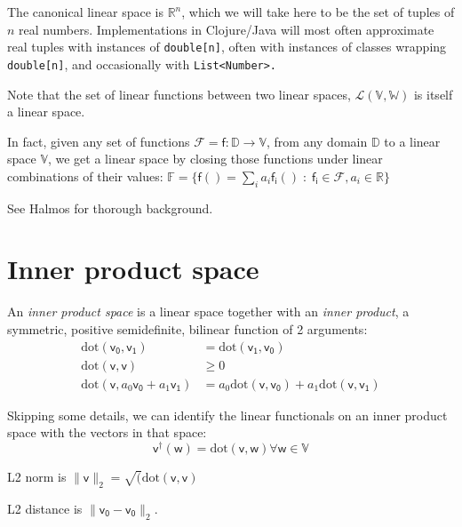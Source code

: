 The canonical linear space is \(\mathbb{R}^n\),
which we will take here to be the set of tuples of \(n\) real
numbers. Implementations in Clojure/Java will most often
approximate real tuples with instances of \texttt{double[n]},
often with instances of classes wrapping \texttt{double[n]},
and occasionally with \texttt{List<Number>.} 

Note that the set of linear functions between two linear
spaces, \(\mathcal{L}(\mathbb{V},\mathbb{W})\) is itself a linear
space. 

In fact, given any set of functions \(\mathcal{F} = {\mathsf{f} :
\mathbb{D} \rightarrow \mathbb{V}}\), 
from any domain \(\mathbb{D}\) to a 
linear space \(\mathbb{V}\),
we get a linear space by closing those functions under linear
combinations of their values:
\(\mathbb{F} = \{ \mathsf{f}() = \sum_i a_i\mathsf{f_i}() \; : \;
\mathsf{f_i} \in \mathcal{F}, a_i \in \mathbb{R} \}\)

See Halmos \cite{halmos-1958} for thorough background.

\section{Inner product space}

An \textit{inner product space} is a linear space
together with an \textit{inner product}, a symmetric,
positive semidefinite, bilinear function of 2 arguments:
\begin{equation}
\begin{split}
\mathrm{dot}(\mathsf{v_0},\mathsf{v_1}) & =
\mathrm{dot}(\mathsf{v_1},\mathsf{v_0}) \\
\mathrm{dot}(\mathsf{v},\mathsf{v}) & \geq 0 \\
\mathrm{dot}(\mathsf{v},a_0\mathsf{v_0}+a_1\mathsf{v_1}) & =
a_0\mathrm{dot}(\mathsf{v},\mathsf{v_0}) + 
a_1\mathrm{dot}(\mathsf{v},\mathsf{v_1})
\end{split} 
\end{equation}

Skipping some details, we can identify
the linear functionals on an inner product space with the 
vectors in that space:
\begin{equation}
\mathsf{v}^{\dagger}(\mathsf{w}) =
\mathrm{dot}(\mathsf{v},\mathsf{w}) \forall \mathsf{w} \in
\mathbb{V}
\end{equation}

L2 norm is
\(\|\mathsf{v}\|_2 = \sqrt(\mathrm{dot}(\mathsf{v},\mathsf{v})
\) 

L2 distance is \(\|\mathsf{v_0}-\mathsf{v_0}\|_2 \). 

